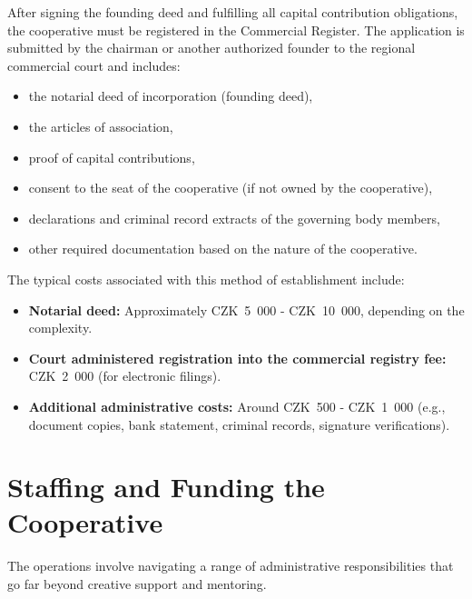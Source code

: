 After signing the founding deed and fulfilling all capital contribution obligations, the cooperative must be registered in the Commercial Register. The application is submitted by the chairman or another authorized founder to the regional commercial court and includes:
\begin{itemize}
    \item the notarial deed of incorporation (founding deed),
    \item the articles of association,
    \item proof of capital contributions,
    \item consent to the seat of the cooperative (if not owned by the cooperative),
    \item declarations and criminal record extracts of the governing body members,
    \item other required documentation based on the nature of the cooperative. \cite{coop-funding}
\end{itemize}
The typical costs associated with this method of establishment include:
\begin{itemize}
    \item \textbf{Notarial deed:} Approximately CZK~5~000 - CZK~10~000, depending on the complexity.
    \item \textbf{Court administered registration into the commercial registry fee:} CZK~2~000 (for electronic filings).
    \item \textbf{Additional administrative costs:} Around CZK~500 - CZK~1~000 (e.g., document copies, bank statement, criminal records, signature verifications). \cite{coop-funding}
\end{itemize}

\section{Staffing and Funding the Cooperative}
The operations involve navigating a range of administrative responsibilities that go far beyond creative support and mentoring.

